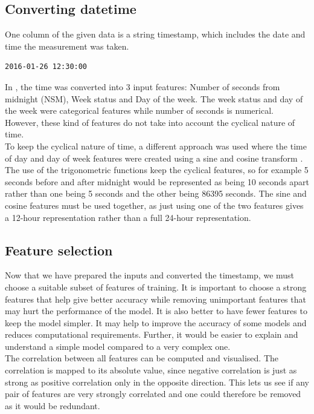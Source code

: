 \documentclass{article}
\newcommand{\n}[0]{\\[\baselineskip]}
\begin{document}
\subsection{Converting datetime}
One column of the given data is a string timestamp, which includes the date and time the measurement was taken. 
\begin{lstlisting}[caption={Example timestamp snippet}, backgroundcolor = \color{lightgray}]
2016-01-26 12:30:00
\end{lstlisting}
In \cite{paper}, the time was converted into 3 input features: Number of seconds from midnight (NSM), Week status and Day of the week. The week status and day of the week were categorical features while number of seconds is numerical. However, these kind of features do not take into account the cyclical nature of time.
\n
To keep the cyclical nature of time, a different approach was used where the time of day and day of week features were created using a sine and cosine transform \cite{cyclic}. The use of the trigonometric functions keep the cyclical features, so for example 5 seconds before and after midnight would be represented as being 10 seconds apart rather than one being 5 seconds and the other being 86395 seconds. The sine and cosine features must be used together, as just using one of the two features gives a 12-hour representation rather than a full 24-hour representation. 



\subsection{Feature selection}
Now that we have prepared the inputs and converted the timestamp, we must choose a suitable subset of features of training. It is important to choose a strong features that help give better accuracy while removing unimportant features that may hurt the performance of the model. It is also better to have fewer features to keep the model simpler. It may help to improve the accuracy of some models and reduces computational requirements. Further, it would be easier to explain and understand a simple model compared to a very complex one. 
\n
The correlation between all features can be computed and visualised. The correlation is mapped to its absolute value, since negative correlation is just as strong as positive correlation only in the opposite direction. This lets us see if any pair of features are very strongly correlated and one could therefore be removed as it would be redundant. 
\end{document}
